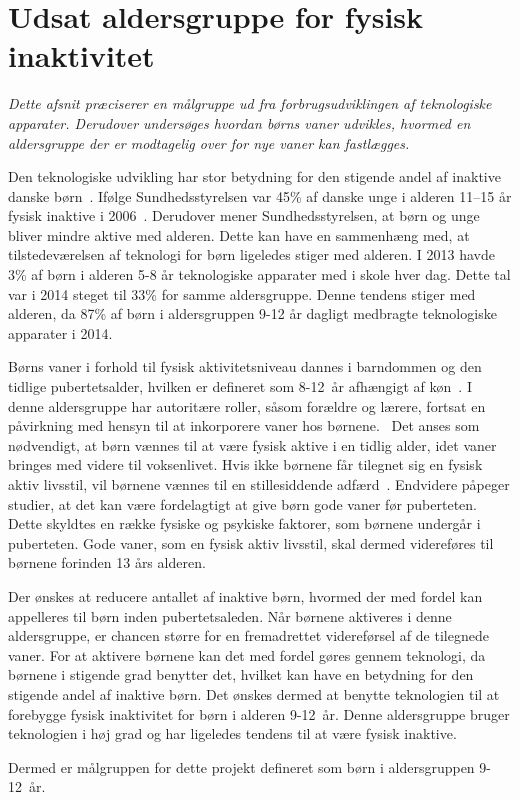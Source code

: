 \section{Udsat aldersgruppe for fysisk inaktivitet} \label{sec:maalgruppe}
\textit{Dette afsnit præciserer en målgruppe ud fra forbrugsudviklingen af teknologiske apparater. Derudover undersøges hvordan børns vaner udvikles, hvormed en aldersgruppe der er modtagelig over for nye vaner kan fastlægges.}

Den teknologiske udvikling har stor betydning for den stigende andel af inaktive danske børn~\citep{Kiens2007}. Ifølge Sundhedsstyrelsen var 45\% af danske unge i alderen 11–15 år fysisk inaktive i 2006~\citep{Sundhedsstyrelsen2006}. Derudover mener Sundhedsstyrelsen, at børn og unge bliver mindre aktive med alderen. Dette kan have en sammenhæng med, at tilstedeværelsen af teknologi for børn ligeledes stiger med alderen. 
I 2013 havde 3\% af børn i alderen 5-8 år teknologiske apparater med i skole hver dag. Dette tal var i 2014 steget til 33\% for samme aldersgruppe. Denne tendens stiger med alderen, da 87\% af børn i aldersgruppen 9-12 år dagligt medbragte teknologiske apparater i 2014.~\citep{Sundhedsstyrelsen2006,GjensidigeForsikring2014} 

Børns vaner i forhold til fysisk aktivitetsniveau dannes i barndommen og den tidlige pubertetsalder, hvilken er defineret som 8-12~år afhængigt af køn~\citep{Wied2011}. I denne aldersgruppe har autoritære roller, såsom forældre og lærere, fortsat en påvirkning med hensyn til at inkorporere vaner hos børnene.~\citep{Wied2011,F.SallisG.Simons-MortonJ.Stone1992,L.MeyerP.Gullotta2012} \newline
Det anses som nødvendigt, at børn vænnes til at være fysisk aktive i en tidlig alder, idet vaner bringes med videre til voksenlivet. Hvis ikke børnene får tilegnet sig en fysisk aktiv livsstil, vil børnene vænnes til en stillesiddende adfærd~\citep{Nabe-NielsenSundhedsministerietetal.2005}. Endvidere påpeger studier, at det kan være fordelagtigt at give børn gode vaner før puberteten. Dette skyldtes en række fysiske og psykiske faktorer, som børnene undergår i puberteten. Gode vaner, som en fysisk aktiv livsstil, skal dermed videreføres til børnene forinden 13 års alderen.~\citep{F.SallisG.Simons-MortonJ.Stone1992,L.MeyerP.Gullotta2012,P.J.KremersBrug2008}

Der ønskes at reducere antallet af inaktive børn, hvormed der med fordel kan appelleres til børn inden pubertetsaleden. Når børnene aktiveres i denne aldersgruppe, er chancen større for en fremadrettet videreførsel af de tilegnede vaner. For at aktivere børnene kan det med fordel gøres gennem teknologi, da børnene i stigende grad benytter det, hvilket kan have en betydning for den stigende andel af inaktive børn. Det ønskes dermed at benytte teknologien til at forebygge fysisk inaktivitet for børn i alderen 9-12~år. Denne aldersgruppe bruger teknologien i høj grad og har ligeledes tendens til at være fysisk inaktive. 

Dermed er målgruppen for dette projekt defineret som børn i aldersgruppen 9-12~år.